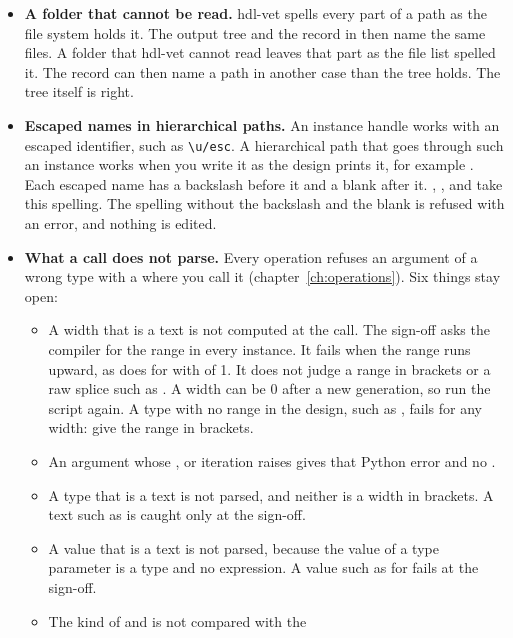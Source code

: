 \begin{itemize}
\item \textbf{A folder that cannot be read.} hdl-vet spells every part of a path as the
  file system holds it. The output tree and the record in  then name
  the same files. A folder that hdl-vet cannot read leaves that part as the file list
  spelled it. The record can then name a path in another case than the tree holds. The
  tree itself is right.
\item \textbf{Escaped names in hierarchical paths.} An instance handle works with an
  escaped identifier, such as \texttt{\textbackslash u/esc}. A hierarchical path
  that goes through such an instance works when you write it as the design prints it, for
  example . Each escaped name has a backslash before it and a
  blank after it. , ,
   and  take this spelling. The spelling without
  the backslash and the blank is refused with an error, and nothing is edited.
\item \textbf{What a call does not parse.} Every operation refuses an argument of a wrong
  type with a  where you call it (chapter~\ref{ch:operations}). Six things
  stay open:
  \begin{itemize}
  \item A width that is a text is not computed at the call. The sign-off asks the compiler
    for the range in every instance. It fails when the range runs upward, as \code{[-1:0]}
    does for  with  of 1. It does not judge a range in brackets or a
    raw splice such as . A width can be 0 after a new generation, so
    run the script again. A type with no range in the design, such as ,
    fails for any width: give the range in brackets.
  \item An argument whose ,  or iteration raises gives that Python
    error and no .
  \item A type that is a text is not parsed, and neither is a width in brackets. A text such as
     is caught only at the sign-off.
  \item A value that is a text is not parsed, because the value of a type parameter is a type
    and no expression. A value such as  for  fails at
    the sign-off.
  \item The kind of  and  is not compared with the

\end{itemize}
\end{itemize}
